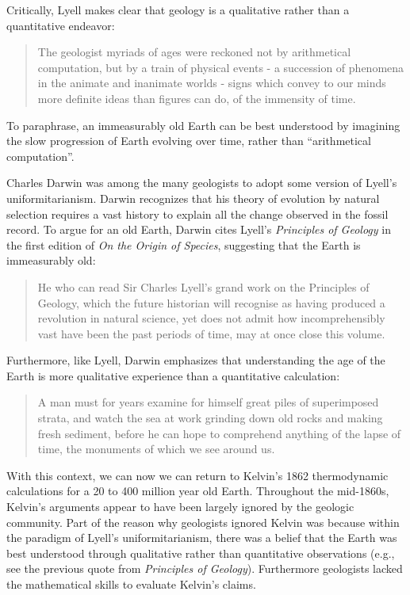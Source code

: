 \documentclass[12pt]{article}
\begin{document}
Critically, Lyell makes clear that geology is a qualitative rather than a quantitative endeavor:

\begin{quote}
  The geologist myriads of ages were reckoned not by arithmetical computation, but by a train of physical events - a succession of phenomena in the animate and inanimate worlds - signs which convey to our minds more definite ideas than figures can do, of the immensity of time. \citep{Lyell_1833}
\end{quote}
To paraphrase, an immeasurably old Earth can be best understood by imagining the slow progression of Earth evolving over time, rather than ``arithmetical computation''.

Charles Darwin was among the many geologists to adopt some version of Lyell's uniformitarianism. Darwin recognizes that his theory of evolution by natural selection requires a vast history to explain all the change observed in the fossil record. To argue for an old Earth, Darwin cites Lyell's \emph{Principles of Geology} in the first edition of \emph{On the Origin of Species}, suggesting that the Earth is immeasurably old:

\begin{quote}
  He who can read Sir Charles Lyell's grand work on the Principles of Geology, which the future historian will recognise as having produced a revolution in natural science, yet does not admit how incomprehensibly vast have been the past periods of time, may at once close this volume. \citep{Darwin_1859}
\end{quote}
Furthermore, like Lyell, Darwin emphasizes that understanding the age of the Earth is more qualitative experience than a quantitative calculation:

\begin{quote}
  A man must for years examine for himself great piles of superimposed strata, and watch the sea at work grinding down old rocks and making fresh sediment, before he can hope to comprehend anything of the lapse of time, the monuments of which we see around us. \citep{Darwin_1859}
\end{quote}

With this context, we can now we can return to Kelvin's 1862 thermodynamic calculations for a 20 to 400 million year old Earth. Throughout the mid-1860s, Kelvin's arguments appear to have been largely ignored by the geologic community. Part of the reason why geologists ignored Kelvin was because within the paradigm of Lyell's uniformitarianism, there was a belief that the Earth was best understood through qualitative rather than quantitative observations (e.g., see the previous quote from \emph{Principles of Geology}). Furthermore geologists lacked the mathematical skills to evaluate Kelvin's claims. 
\end{document}
